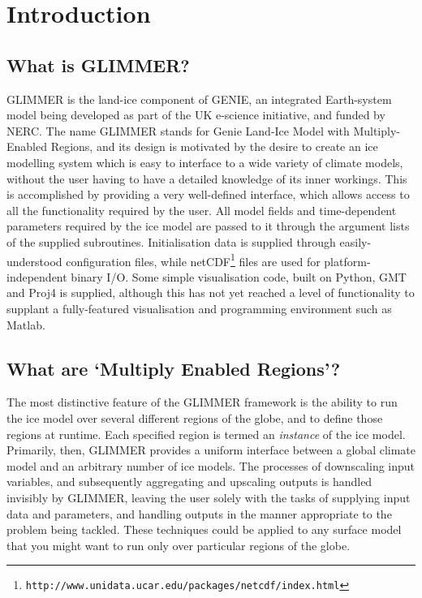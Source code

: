 \section{Introduction}

\subsection{What is GLIMMER?}

GLIMMER is the land-ice component of GENIE, an integrated Earth-system model
being developed as part of the UK e-science initiative, and funded by
NERC. The name GLIMMER stands for Genie Land-Ice Model with Multiply-Enabled
Regions, and its design is motivated by the desire to
create an ice modelling system which is easy to interface to a wide variety of
climate models, without the user having to have a detailed knowledge of its
inner workings. This is
accomplished by providing a very well-defined interface, which allows access to
all the functionality required by the user. All model fields and
time-dependent parameters required by the ice model are passed to it through
the argument lists of the supplied subroutines. Initialisation data is
supplied through easily-understood configuration files, while 
netCDF\footnote{\texttt{http://www.unidata.ucar.edu/packages/netcdf/index.html}} 
files are used for platform-independent binary I/O. Some simple visualisation
code, built on Python, GMT and Proj4 is supplied, although this has not yet
reached a level of functionality to supplant a fully-featured visualisation
and programming environment such as Matlab.

\subsection{What are `Multiply Enabled Regions'?}

The most distinctive feature of the GLIMMER framework is the ability to
run the ice model over several different regions of the globe, and to define
those regions at runtime. Each specified region is termed an \emph{instance}
of the ice model. Primarily, then, GLIMMER provides a uniform interface
between a global climate model and an arbitrary number of ice models. The
processes of downscaling input variables, and subsequently aggregating and
upscaling outputs is handled invisibly by GLIMMER, leaving the user solely
with the tasks of supplying input data and parameters, and handling outputs in
the manner appropriate to the problem being tackled. These techniques could be
applied to any surface model that you might want to run only over
particular regions of the globe.

